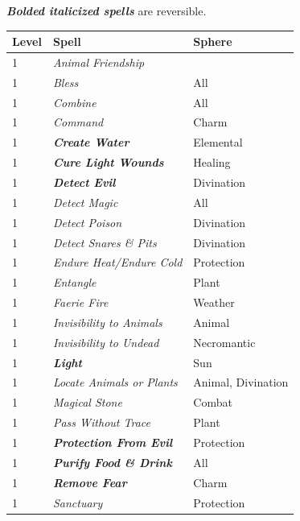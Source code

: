 \begin{multicols}{2}
\textbf{\textit{Bolded italicized spells}} are reversible.

\noindent
\begin{minipage}{\columnwidth}

\label{priestspelllist}
\noindent
\begin{tabular}{|p{}|p{}|p{}|}
\hline
Level	& Spell	& Sphere \\
\hline\hline
\rowcolor[gray]{.9}1	& \textit{Animal Friendship}	&  \\
1	& \textit{Bless}	& All \\
\rowcolor[gray]{.9}1	& \textit{Combine}	& All \\
1	& \textit{Command}	& Charm \\
\rowcolor[gray]{.9}1	& \textbf{\textit{Create Water}}	& Elemental \\
1	& \textbf{\textit{Cure Light Wounds}}	& Healing \\
\rowcolor[gray]{.9}1	& \textbf{\textit{Detect Evil}}	& Divination \\
1	& \textit{Detect Magic}	& All \\
\rowcolor[gray]{.9}1	& \textit{Detect Poison}	& Divination \\
1	& \textit{Detect Snares \& Pits}	& Divination \\
\rowcolor[gray]{.9}1	& \textit{Endure Heat/Endure Cold}	& Protection \\
1	& \textit{Entangle}	& Plant \\
\rowcolor[gray]{.9}1	& \textit{Faerie Fire}	& Weather \\
1	& \textit{Invisibility to Animals}	& Animal \\
\rowcolor[gray]{.9}1	& \textit{Invisibility to Undead}	& Necromantic \\
1	& \textbf{\textit{Light}}	& Sun \\
\rowcolor[gray]{.9}1	& \textit{Locate Animals or Plants}	& Animal, Divination \\
1	& \textit{Magical Stone}	& Combat \\
\rowcolor[gray]{.9}1	& \textit{Pass Without Trace}	& Plant \\
1	& \textbf{\textit{Protection From Evil}}	& Protection \\
\rowcolor[gray]{.9}1	& \textbf{\textit{Purify Food \& Drink}}	& All \\
1	& \textbf{\textit{Remove Fear}}	& Charm \\
\rowcolor[gray]{.9}1	& \textit{Sanctuary}	& Protection \\

\end{tabular}
\end{minipage}
\end{multicols}
